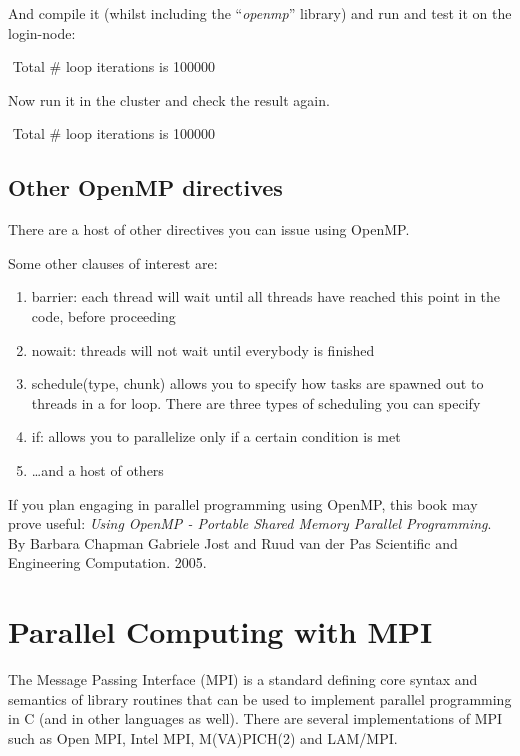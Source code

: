 And compile it (whilst including the ``\textit{openmp}'' library) and run and test it on the login-node:
\begin{prompt}
$ %
$ %
Total \# loop iterations is 100000
\end{prompt}

Now run it in the cluster and check the result again.
\begin{prompt}
$ %
$ %
Total \# loop iterations is 100000
\end{prompt}

\subsection{Other OpenMP directives}

There are a host of other directives you can issue using OpenMP.

Some other clauses of interest are:

\begin{enumerate}
\item  barrier: each thread will wait until all threads have reached this point in the code, before proceeding
\item  nowait: threads will not wait until everybody is finished
\item  schedule(type, chunk) allows you to specify how tasks are spawned out to threads in a for loop. There are three types of scheduling you can specify
\item  if: allows you to parallelize only if a certain condition is met
\item  \dots  and a host of others
\end{enumerate}

 If you plan engaging in parallel programming using OpenMP, this book may prove useful: \textit{Using OpenMP - Portable Shared Memory Parallel Programming}. By Barbara Chapman Gabriele Jost and Ruud van der Pas Scientific and Engineering Computation. 2005.

\section{Parallel Computing with MPI }

The Message Passing Interface (MPI) is a standard defining core syntax and semantics of library routines that can be used to implement parallel programming in C (and in other languages as well). There are several implementations of MPI such as Open MPI, Intel MPI, M(VA)PICH(2) and LAM/MPI.


